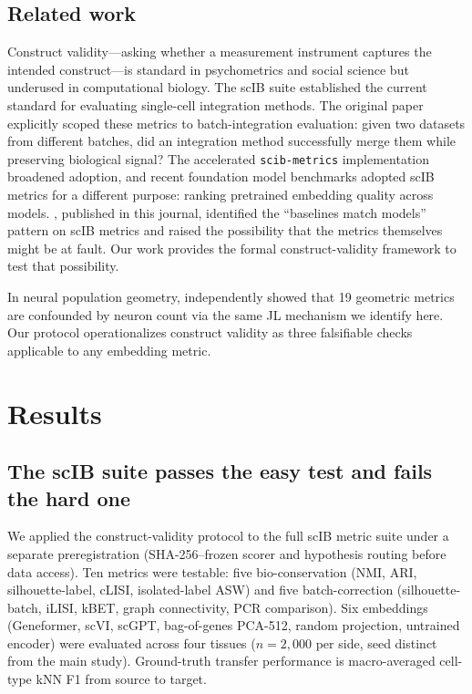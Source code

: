 \documentclass[10pt,letterpaper]{article}
\begin{document}
\subsection{Related work}

Construct validity---asking whether a measurement instrument captures the intended construct---is standard in psychometrics and social science but underused in computational biology. The scIB suite \citep{luecken2022scib} established the current standard for evaluating single-cell integration methods. The original paper explicitly scoped these metrics to batch-integration evaluation: given two datasets from different batches, did an integration method successfully merge them while preserving biological signal? The accelerated \texttt{scib-metrics} implementation \citep{scibmetrics2023} broadened adoption, and recent foundation model benchmarks \citep{wu2025scfm, vcbench2026, unifiedscfm2026, cellxgeneintegration2026} adopted scIB metrics for a different purpose: ranking pretrained embedding quality across models. \citet{wu2025scfm}, published in this journal, identified the ``baselines match models'' pattern on scIB metrics and raised the possibility that the metrics themselves might be at fault. Our work provides the formal construct-validity framework to test that possibility.

In neural population geometry, \citet{tower2026bracket} independently showed that 19 geometric metrics are confounded by neuron count via the same JL mechanism we identify here. Our protocol operationalizes construct validity as three falsifiable checks applicable to any embedding metric.


\section{Results}

\subsection{The scIB suite passes the easy test and fails the hard one}
\label{sec:scib}

We applied the construct-validity protocol to the full scIB metric suite \citep{luecken2022scib} under a separate preregistration (SHA-256--frozen scorer and hypothesis routing before data access). Ten metrics were testable: five bio-conservation (NMI, ARI, silhouette-label, cLISI, isolated-label ASW) and five batch-correction (silhouette-batch, iLISI, kBET, graph connectivity, PCR comparison). Six embeddings (Geneformer, scVI, scGPT, bag-of-genes PCA-512, random projection, untrained encoder) were evaluated across four tissues ($n = 2{,}000$ per side, seed distinct from the main study). Ground-truth transfer performance is macro-averaged cell-type kNN F1 from source to target.
\end{document}
